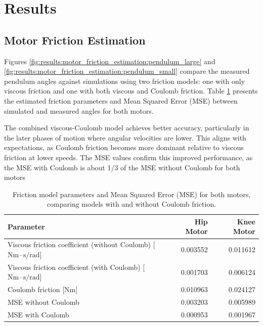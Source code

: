 \section{Results}
\label{sec:results}

\subsection{Motor Friction Estimation}
\label{sec:results:motor_friction_estimation}
Figures \ref{fig:results:motor_friction_estimation:pendulum_large} and \ref{fig:results:motor_friction_estimation:pendulum_small} compare the measured pendulum angles against simulations using two friction models: one with only viscous friction and one with both viscous and Coulomb friction. Table \ref{tab:results:motor_friction_parameters} presents the estimated friction parameters and Mean Squared Error (MSE) between simulated and measured angles for both motors.

The combined viscous-Coulomb model achieves better accuracy, particularly in the later phases of motion where angular velocities are lower. This aligns with expectations, as Coulomb friction becomes more dominant relative to viscous friction at lower speeds. The MSE values confirm this improved performance, as the MSE with Coulomb is about 1/3 of the MSE without Coulomb for both motors%

\begin{table}[h]
    \centering
    \begin{tabular}{lrr}
        \hline
        Parameter & Hip Motor & Knee Motor \\
        \hline
        Viscous friction coefficient (without Coulomb) [$\mathrm{Nm \cdot s/rad}$] & 0.003552 & 0.011612 \\
        Viscous friction coefficient (with Coulomb) [$\mathrm{Nm \cdot s/rad}$] & 0.001703 & 0.006124 \\
        Coulomb friction [Nm] & 0.010963 & 0.024127 \\
        MSE without Coulomb & 0.003203 & 0.005989 \\
        MSE with Coulomb & 0.000953 & 0.001967 \\
        \hline
    \end{tabular}
    \caption{Friction model parameters and Mean Squared Error (MSE) for both motors, comparing models with and without Coulomb friction.}
    \label{tab:results:motor_friction_parameters}
\end{table}




